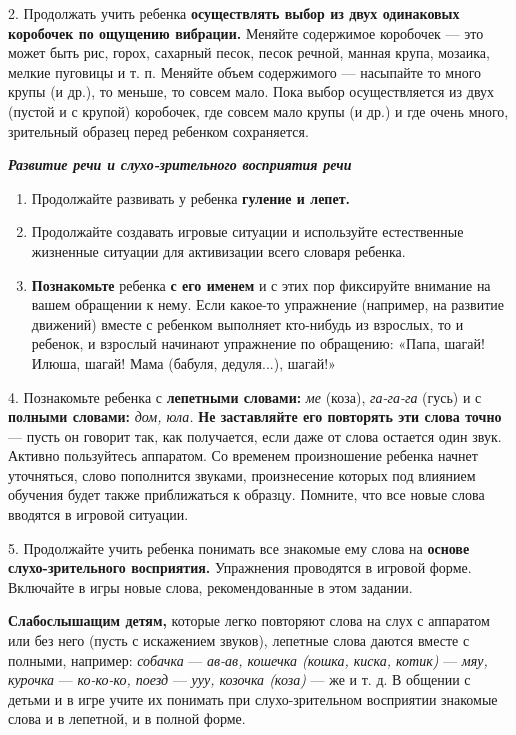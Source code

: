 \documentclass{book}
\renewcommand{\emph}[1]{\textit{#1}}
\begin{document}
2. Продолжать учить ребенка \textbf{осуществлять выбор из двух
одинаковых коробочек по ощущению вибрации.} Меняйте содержимое коробочек
--- это может быть рис, горох, сахарный песок, песок речной, манная
крупа, мозаика, мелкие пуговицы и т. п. Меняйте объем содержимого ---
насыпайте то много крупы (и др.), то меньше, то совсем мало. Пока выбор
осуществляется из двух (пустой и с крупой) коробочек, где совсем мало
крупы (и др.) и где очень много, зрительный образец перед ребенком
сохраняется.

\emph{\textbf{Развитие речи и слухо-зрительного восприятия речи}}


\begin{enumerate}
\def\labelenumi{\arabic{enumi}.}
\item
  
  Продолжайте развивать у ребенка \textbf{гуление и лепет.}
  
\item
  
  Продолжайте создавать игровые ситуации и используйте естественные
  жизненные ситуации для активизации всего словаря ребенка.
  
\item
  
  \textbf{Познакомьте} ребенка \textbf{с его именем} и с этих пор
  фиксируйте внимание на вашем обращении к нему. Если какое-то
  упражнение (например, на развитие движений) вместе с ребенком
  выполняет кто-нибудь из взрослых, то и ребенок, и взрослый начинают
  упражнение по обращению: «Папа, шагай! Илюша, шагай! Мама (бабуля,
  дедуля...), шагай!»
  
\end{enumerate}


4. Познакомьте ребенка с \textbf{лепетными словами:} \emph{ме} (коза),
\emph{га-га-га} (гусь) и с \textbf{полными словами:} \emph{дом, юла.}
\textbf{Не заставляйте его повторять эти слова точно} --- пусть он
говорит так, как получается, если даже от слова остается один звук.
Активно пользуйтесь аппаратом. Со временем произношение ребенка начнет
уточняться, слово пополнится звуками, произнесение которых под влиянием
обучения будет также приближаться к образцу. Помните, что все новые
слова вводятся в игровой ситуации.

5. Продолжайте учить ребенка понимать все знакомые ему слова на
\textbf{основе слухо-зрительного восприятия.} Упражнения проводятся в
игровой форме. Включайте в игры новые слова, рекомендованные в этом
задании.

\textbf{Слабослышащим детям,} которые легко повторяют слова на слух с
аппаратом или без него (пусть с искажением звуков), лепетные слова
даются вместе с полными, например: \emph{собачка} --- \emph{ав-ав,
кошечка (кошка, киска, котик)} --- \emph{мяу, курочка} ---
\emph{ко-ко-ко, поезд} --- \emph{ууу, козочка (коза)} --- же и т. д. В
общении с детьми и в игре учите их понимать при слухо-зрительном
восприятии знакомые слова и в лепетной, и в полной форме.
\end{document}

